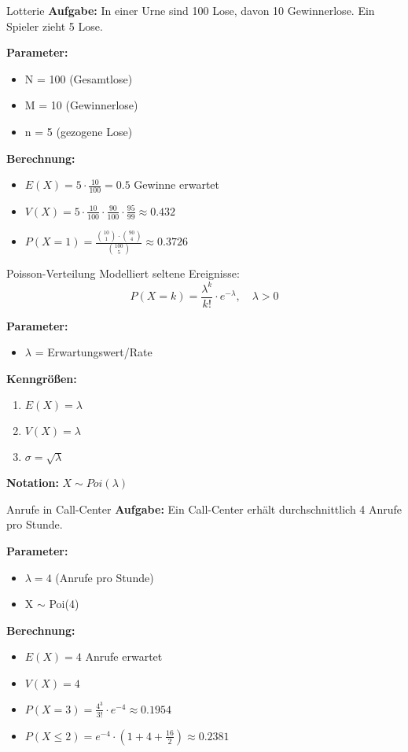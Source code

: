 \begin{example}{Lotterie}
\textbf{Aufgabe:} In einer Urne sind 100 Lose, davon 10 Gewinnerlose. Ein Spieler zieht 5 Lose.

\textbf{Parameter:}
\begin{itemize}
\item N = 100 (Gesamtlose)
\item M = 10 (Gewinnerlose)
\item n = 5 (gezogene Lose)
\end{itemize}

\textbf{Berechnung:}
\begin{itemize}
\item $E(X) = 5 \cdot \frac{10}{100} = 0.5$ Gewinne erwartet
\item $V(X) = 5 \cdot \frac{10}{100} \cdot \frac{90}{100} \cdot \frac{95}{99} \approx 0.432$
\item $P(X=1) = \frac{\binom{10}{1} \cdot \binom{90}{4}}{\binom{100}{5}} \approx 0.3726$
\end{itemize}
\end{example}

\begin{definition}{Poisson-Verteilung}
Modelliert seltene Ereignisse:
$$P(X=k) = \frac{\lambda^k}{k!} \cdot e^{-\lambda}, \quad \lambda > 0$$

\textbf{Parameter:}
\begin{itemize}
    \item $\lambda$ = Erwartungswert/Rate
\end{itemize}

\textbf{Kenngrößen:}
\begin{enumerate}
    \item $E(X) = \lambda$
    \item $V(X) = \lambda$
    \item $\sigma = \sqrt{\lambda}$
\end{enumerate}

\textbf{Notation:} $X \sim Poi(\lambda)$
\end{definition}

\begin{example}{Anrufe in Call-Center}
\textbf{Aufgabe:} Ein Call-Center erhält durchschnittlich 4 Anrufe pro Stunde.

\textbf{Parameter:}
\begin{itemize}
\item $\lambda = 4$ (Anrufe pro Stunde)
\item X $\sim$ Poi(4)
\end{itemize}

\textbf{Berechnung:}
\begin{itemize}
\item $E(X) = 4$ Anrufe erwartet
\item $V(X) = 4$
\item $P(X=3) = \frac{4^3}{3!} \cdot e^{-4} \approx 0.1954$
\item $P(X \leq 2) = e^{-4} \cdot (1 + 4 + \frac{16}{2}) \approx 0.2381$
\end{itemize}
\end{example}

